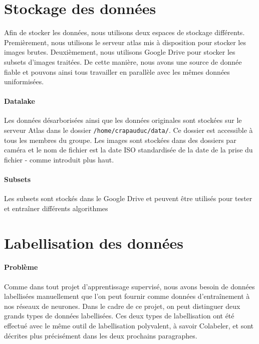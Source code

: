 \section{Stockage des données}
Afin de stocker les données, nous utilisons deux espaces de stockage différents. Premièrement, nous utilisons le serveur atlas mis à disposition pour stocker les images brutes. Deuxièmement, nous utilisons Google Drive pour stocker les subsets d'images traitées. De cette manière, nous avons une source de donnée fiable et pouvons ainsi tous travailler en parallèle avec les mêmes données uniformisées.

\paragraph*{Datalake}

Les données désarborisées ainsi que les données originales sont stockées sur le serveur Atlas dans le dossier \texttt{/home/crapauduc/data/}. Ce dossier est accessible à tous les membres du groupe. Les images sont stockées dans des dossiers par caméra et le nom de fichier est la date ISO standardisée de la date de la prise du fichier - comme introduit plus haut.

\paragraph{Subsets}

Les subsets sont stockés dans le Google Drive et peuvent être utilisés pour tester et entraîner différents algorithmes

\section{Labellisation des données}

\paragraph{Problème}

Comme dans tout projet d'apprentissage supervisé, nous avons besoin de données labellisées manuellement que l'on peut fournir comme données d'entraînement à nos réseaux de neurones. Dans le cadre de ce projet, on peut distinguer deux grands types de données labellisées. Ces deux types de labellisation ont été effectué avec le même outil de labellisation polyvalent, à savoir Colabeler, et sont décrites plus précisément dans les deux prochains paragraphes.


